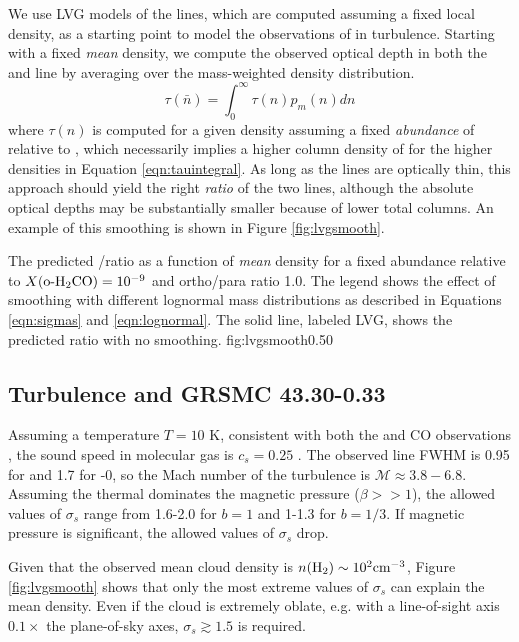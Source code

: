 We use LVG models of the \formaldehyde lines, which are computed assuming a
fixed local density, as a starting point to model the observations of
\formaldehyde in turbulence.   Starting with a fixed \emph{mean} density, we
compute the observed \formaldehyde optical depth in both the \oneone and \twotwo
line by averaging over the mass-weighted density distribution.
\begin{equation}
    \label{eqn:tauintegral}
    \tau(\bar{n}) = \int_0^\infty \tau(n) p_m(n) dn
\end{equation}
where $\tau(n)$ is computed for a given density assuming a fixed
\emph{abundance} of \ortho relative to \hh, which necessarily implies a higher
column density of \ortho for the higher densities in Equation
\ref{eqn:tauintegral}.  As long as the \formaldehyde lines are optically thin,
this approach should yield the right \emph{ratio} of the two lines, although the
absolute optical depths may be substantially smaller because of lower total
\ortho columns.  An example of this smoothing is shown in Figure
\ref{fig:lvgsmooth}.

{The predicted \formaldehyde \oneone/\twotwo ratio as a function of \emph{mean}
density for a fixed abundance relative to \hh $X(\textrm{o-H}_2\textrm{CO}) = 10^{-9}$ and \hh
ortho/para ratio 1.0.  The legend shows the effect of smoothing with different
lognormal mass distributions as described in Equations \ref{eqn:sigmas} and
\ref{eqn:lognormal}.  The solid line, labeled LVG, shows the predicted ratio
with no smoothing.
}
{fig:lvgsmooth}{0.5}{0}

\subsection{Turbulence and GRSMC 43.30-0.33}
Assuming a temperature $T=10$ K, consistent with both the \formaldehyde and CO
observations \citep{Plume2004a}, the sound speed in molecular gas is $c_s=0.25$
\kms.  The observed line FWHM is 0.95 \kms for \formaldehyde and 1.7 \kms for
-0, so the Mach number of the turbulence is $\mathcal{M} \approx
3.8-6.8$.  Assuming the thermal dominates the magnetic pressure ($\beta>>1$),
the allowed values of $\sigma_s$ range from 1.6-2.0 for $b=1$ and 1-1.3 for
$b=1/3$.  If magnetic pressure is significant, the allowed values of $\sigma_s$
drop.

Given that the observed mean cloud density is $n(\textrm{H}_{2})\sim10^2 \textrm{cm}^{-3}$, Figure
\ref{fig:lvgsmooth} shows that only the most extreme values of $\sigma_s$ can
explain the mean density.  Even if the cloud is extremely oblate, e.g. with a
line-of-sight axis $0.1\times$ the plane-of-sky axes, $\sigma_s \gtrsim 1.5$ is
required.

